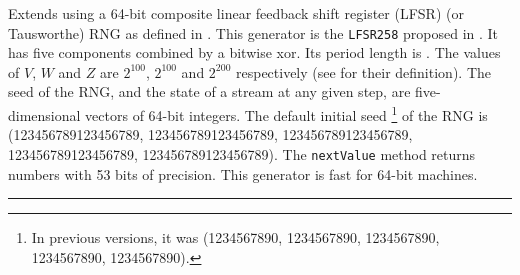 
Extends  using a  64-bit composite linear feedback
shift register (LFSR) (or Tausworthe) RNG as defined in
\cite{rLEC96a,rTEZ91b}.
This generator is the \texttt{LFSR258} proposed in \cite{rLEC99a}.
It has five components combined by a bitwise xor.
Its period length is 
. The values of $V$, $W$ and $Z$ are $2^{100}$,
$2^{100}$ and $2^{200}$ respectively (see  for their
definition). The seed of the RNG, and the state of a stream at any given
step, are five-dimensional vectors of 64-bit integers.
The default initial seed \footnote{In previous versions, it was
(1234567890, 1234567890, 1234567890, 1234567890, 1234567890).}
 of the RNG is (123456789123456789, 123456789123456789, 123456789123456789,
 123456789123456789, 123456789123456789).
The \texttt{nextValue} method returns numbers with 53 bits of precision.
This generator is fast for 64-bit machines.

\bigskip\hrule

